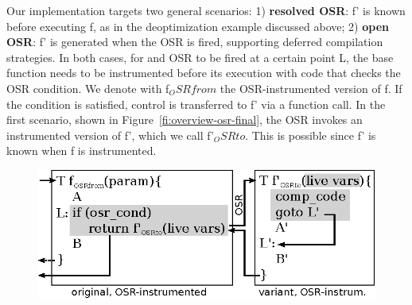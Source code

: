 Our implementation targets two general scenarios: 1) {\bf resolved OSR}: \textsf{f'} is known before executing \textsf{f}, as in the deoptimization example discussed above; 2) {\bf open OSR}: \textsf{f'} is generated when the OSR is fired, supporting deferred compilation strategies. In both cases, for and OSR to be fired at a certain point \textsf{L}, the base function needs to be instrumented before its execution with code that checks the OSR condition. We denote with \textsf{f$_OSRfrom$} the OSR-instrumented version of \textsf{f}. If the condition is satisfied, control is transferred to \textsf{f'} via a function call. In the first scenario, shown in Figure~\ref{fi:overview-osr-final}, the OSR invokes an instrumented version of \textsf{f'}, which we call \textsf{f'$_OSRto$}. This is possible since \textsf{f'} is known when \textsf{f} is instrumented.



%
%

\ifdefined\noauthorea
\begin{figure}[t]
\begin{center}
\includegraphics[width=0.7\columnwidth]{figures/overview-osr-final/overview-osr-final.eps}
\caption{\protect}
\end{center}
\end{figure}
\fi

